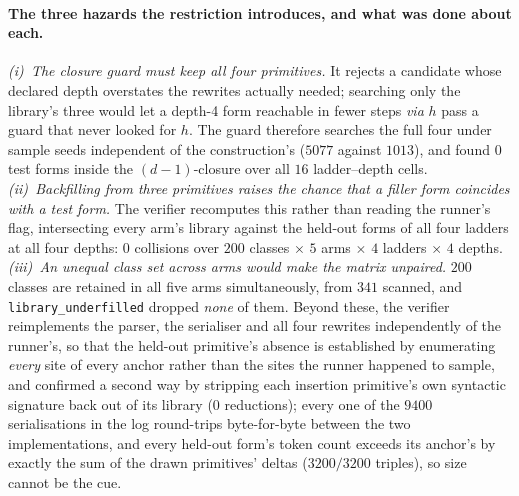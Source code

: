 \paragraph{The three hazards the restriction introduces, and what was done about each.} \emph{(i)~The closure guard must keep all four primitives.} It rejects a candidate whose declared depth overstates the rewrites actually needed; searching only the library's three would let a depth-4 form reachable in fewer steps \emph{via} $h$ pass a guard that never looked for $h$. The guard therefore searches the full four under sample seeds independent of the construction's ($5077$ against $1013$), and found $0$ test forms inside the $(d{-}1)$-closure over all $16$ ladder--depth cells. \emph{(ii)~Backfilling from three primitives raises the chance that a filler form coincides with a test form.} The verifier recomputes this rather than reading the runner's flag, intersecting every arm's library against the held-out forms of all four ladders at all four depths: $0$ collisions over $200$ classes $\times$ $5$ arms $\times$ $4$ ladders $\times$ $4$ depths. \emph{(iii)~An unequal class set across arms would make the matrix unpaired.} $200$ classes are retained in all five arms simultaneously, from $341$ scanned, and \texttt{library\_underfilled} dropped \emph{none} of them. Beyond these, the verifier reimplements the parser, the serialiser and all four rewrites independently of the runner's, so that the held-out primitive's absence is established by enumerating \emph{every} site of every anchor rather than the sites the runner happened to sample, and confirmed a second way by stripping each insertion primitive's own syntactic signature back out of its library ($0$ reductions); every one of the $9400$ serialisations in the log round-trips byte-for-byte between the two implementations, and every held-out form's token count exceeds its anchor's by exactly the sum of the drawn primitives' deltas ($3200/3200$ triples), so size cannot be the cue.

